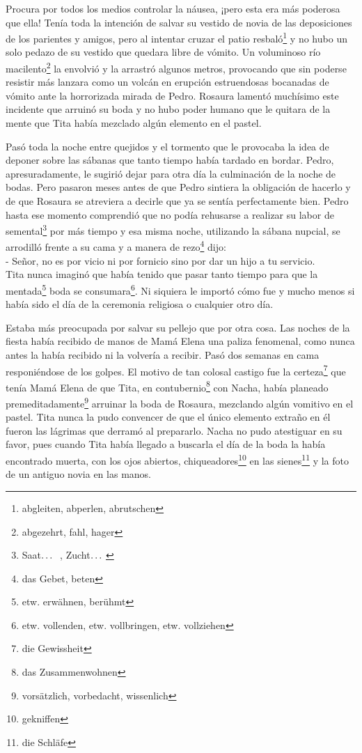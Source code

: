 Procura por todos los medios controlar la náusea, ¡pero esta era más
poderosa que ella! Tenía toda la intención de salvar su vestido de novia
de las deposiciones de los parientes y amigos, pero al intentar cruzar
el patio resbaló\footnote{abgleiten, abperlen, abrutschen} y no
hubo un solo pedazo de su vestido que quedara libre de vómito. Un voluminoso
río macilento\footnote{abgezehrt, fahl, hager} la envolvió y la
arrastró algunos metros, provocando que sin poderse resistir más lanzara como un
volcán en erupción estruendosas bocanadas de vómito ante la horrorizada
mirada de Pedro. Rosaura lamentó muchísimo este incidente que arruinó su
boda y no hubo poder humano que le quitara de la mente que Tita había
mezclado algún elemento en el pastel.

Pasó toda la noche entre quejidos y el tormento que le provocaba la
idea de deponer sobre las sábanas que tanto tiempo había tardado en
bordar. Pedro, apresuradamente, le sugirió dejar para otra día la
culminación de la noche de bodas. Pero pasaron meses antes de que Pedro
sintiera la obligación de hacerlo y de que Rosaura se atreviera a
decirle que ya se sentía perfectamente bien. Pedro hasta ese momento
comprendió que no podía rehusarse a realizar su labor de semental\footnote{ Saat$\ldots~$ , Zucht$\ldots~$ } por más tiempo y esa
misma noche, utilizando la sábana nupcial, se arrodilló frente a su
cama y a manera de rezo\footnote{das Gebet, beten} dijo:
\\- Señor, no es por vicio ni por fornicio sino por dar un hijo a tu %
servicio.\\

Tita nunca imaginó que había tenido que pasar tanto tiempo para que la mentada\footnote{etw. erwähnen, berühmt} boda se consumara\footnote{etw. vollenden, etw. vollbringen, etw. vollziehen}. Ni
siquiera le importó cómo fue y mucho menos si había sido el día de la
ceremonia religiosa o cualquier otro día.

Estaba más preocupada por salvar su pellejo que por otra cosa. Las
noches de la fiesta había recibido de manos de Mamá Elena una
paliza fenomenal, como nunca antes
la había recibido ni la volvería a recibir. Pasó dos semanas en cama
responiéndose de los golpes. El motivo de tan colosal castigo fue la certeza\footnote{die Gewissheit} que tenía Mamá Elena de que Tita, en contubernio\footnote{das Zusammenwohnen} con Nacha, había
planeado premeditadamente\footnote{vorsätzlich, vorbedacht, wissenlich}
arruinar la boda de Rosaura, mezclando algún vomitivo en el pastel. Tita
nunca la pudo convencer de que el único elemento extraño en él fueron las
lágrimas que derramó al prepararlo. Nacha no pudo atestiguar en su favor, pues cuando
Tita había llegado a buscarla el día de la boda la había encontrado
muerta, con los ojos abiertos, chiqueadores\footnote{gekniffen}
en las sienes\footnote{die Schläfe} y la foto de
un antiguo novia en las manos.

